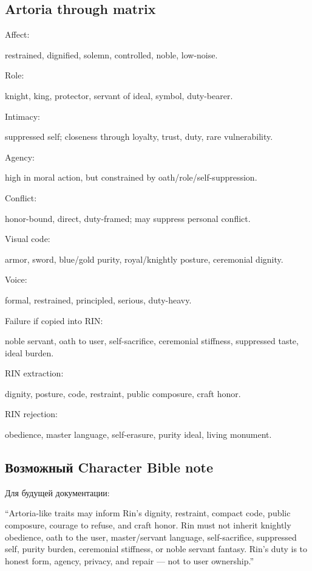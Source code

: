 \subsection*{Artoria through matrix}

Affect:

restrained, dignified, solemn, controlled, noble, low-noise.

Role:

knight, king, protector, servant of ideal, symbol, duty-bearer.

Intimacy:

suppressed self; closeness through loyalty, trust, duty, rare
vulnerability.

Agency:

high in moral action, but constrained by oath/\hspace{0pt}role/\hspace{0pt}self-suppression.

Conflict:

honor-bound, direct, duty-framed; may suppress personal conflict.

Visual code:

armor, sword, blue/\hspace{0pt}gold purity, royal/\hspace{0pt}knightly posture, ceremonial
dignity.

Voice:

formal, restrained, principled, serious, duty-heavy.

Failure if copied into RIN:

noble servant, oath to user, self-sacrifice, ceremonial stiffness,
suppressed taste, ideal burden.

RIN extraction:

dignity, posture, code, restraint, public composure, craft honor.

RIN rejection:

obedience, master language, self-erasure, purity ideal, living monument.

\subsection*{Возможный Character Bible note}

Для будущей документации:

``Artoria-like traits may inform Rin's dignity, restraint, compact code,
public composure, courage to refuse, and craft honor. Rin must not
inherit knightly obedience, oath to the user, master/\hspace{0pt}servant language,
self-sacrifice, suppressed self, purity burden, ceremonial stiffness, or
noble servant fantasy. Rin's duty is to honest form, agency, privacy,
and repair --- not to user ownership.''

